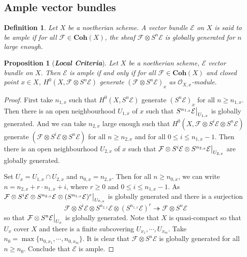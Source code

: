 \documentclass{ctexart}
\newtheorem{definition}{Definition}[section]
\newtheorem{proposition}{Proposition}[section]
\newcommand{\coherent}{\mathbf{Coh}}
\begin{document}
\subsection{Ample vector bundles}
\label{subsection:Ample_Vector_Bundles_Ample_vector_bundles}

\begin{definition}
    Let $X$ be a noetherian scheme.
    A vector bundle $\mathcal{E}$ on $X$ is said to be ample if for all $\mathcal{F}\in \coherent (X)$,
    the sheaf $\mathcal{F} \otimes S^{n}\mathcal{E}$ is globally generated for $n$ large enough.
\end{definition}
\begin{proposition}[\textbf{\emph{Local Criteria}}]
    Let $X$ be a noetherian scheme, $\mathcal{E}$ vector bundle on $X$.
    Then $\mathcal{E}$ is ample if and only if for all $\mathcal{F}\in \coherent (X)$ and closed point $x\in X$,
    $H^{0}(X, \mathcal{F} \otimes S^{n}\mathcal{E})$ generate $(\mathcal{F} \otimes S^{n}\mathcal{E})_{x}$ as $\mathcal{O}_{X, x}$-module.
    \label{Proposition 4.7}
\end{proposition}
\begin{proof}
    First take $n_{1, x}$ such that $H^{0}(X, S^{n}\mathcal{E})$ generate $(S^{n}\mathcal{E})_{x}$ for all $n \ge n_{1, x}$.
    Then there is an open neighbourhood $U_{1, x}$ of $x$ such that $S^{n_{1, x}}\mathcal{E}\big{|}_{U_{1, x}}$ is globally generated.
    And we can take $n_{2, x}$ large enough such that $H^{0}(X, \mathcal{F} \otimes S^{i}\mathcal{E} \otimes S^{n}\mathcal{E})$ generate $(\mathcal{F} \otimes S^{i}\mathcal{E} \otimes S^{n}\mathcal{E})$ for all $n \ge n_{2, x}$ and for all $0 \le i \le n_{1, x} - 1$.
    Then there is an open neighbourhood $U_{2, x}$ of $x$ such that $\mathcal{F} \otimes S^{i}\mathcal{E} \otimes S^{n_{2, x}}\mathcal{E}\big{|}_{U_{2, x}}$ are globally generated.
    \par
    Set $U_{x} = U_{1, x} \cap U_{2, x}$ and $n_{0, x} = n_{2, x}$.
    Then for all $n \ge n_{0, x}$, we can write $n = n_{2, x} + r \cdot n_{1, x} + i$,
    where $r \ge 0$ and $0 \le i \le n_{1, x} - 1$.
    As $\mathcal{F} \otimes S^{i}\mathcal{E} \otimes S^{n_{2, x}}\mathcal{E} \otimes (S^{n_{1, x}}\mathcal{E})^{r}\big{|}_{U_{0, x}}$ is globally generated and there is a surjection
    \begin{equation}
        \mathcal{F} \otimes S^{i}\mathcal{E} \otimes S^{n_{2, x}}\mathcal{E} \otimes (S^{n_{1, x}}\mathcal{E})^{r} \twoheadrightarrow \mathcal{F} \otimes S^{n}\mathcal{E}
    \end{equation}
    so that $\mathcal{F} \otimes S^{n}\mathcal{E}\big{|}_{U_{x}}$ is globally generated.
    Note that $X$ is quasi-compact so that $U_{x}$ cover $X$ and there is a finite subcovering $U_{x_{1}}, \cdots, U_{x_{m}}$.
    Take $n_{0} = \max \{n_{0, x_{1}}, \cdots, n_{0, x_{m}}\}$.
    It is clear that $\mathcal{F} \otimes S^{n}\mathcal{E}$ is globally generated for all $n \ge n_{0}$.
    Conclude that $\mathcal{E}$ is ample.
\end{proof}
\end{document}
